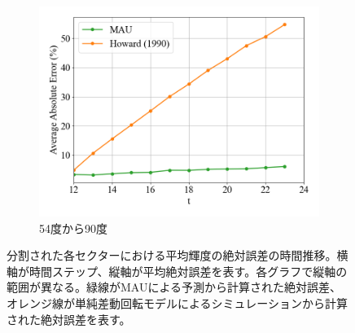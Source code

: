 \begin{figure}[htbp]
              \begin{subfigure}{0.5\textwidth}
                \centering
                \includegraphics[width=\textwidth]{figures/exp2/lng_error_5.png}
                \caption{54度から90度}
              \end{subfigure}
              \caption{分割された各セクターにおける平均輝度の絶対誤差の時間推移。横軸が時間ステップ、縦軸が平均絶対誤差を表す。各グラフで縦軸の範囲が異なる。緑線がMAUによる予測から計算された絶対誤差、オレンジ線が単純差動回転モデルによるシミュレーションから計算された絶対誤差を表す。}
              \label{fig:lng_error}
            \end{figure}
          
